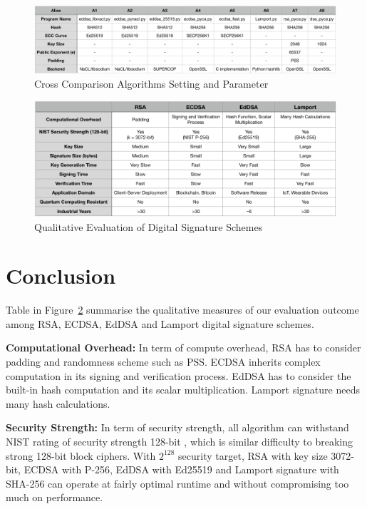\documentclass[10pt,sigconf]{acmart}
\begin{document}
\begin{figure}
\centering
\includegraphics[scale=0.4]{Cross_Compare_Label.png}
\caption{\small{Cross Comparison Algorithms Setting and Parameter}}
\label{fig:Cross_Compare_Label}
\end{figure}

\begin{figure}
\centering
\includegraphics[scale=0.45]{Qualitative_Evaluation}
\caption{\small{Qualitative Evaluation of Digital Signature Schemes}}
\label{fig:Qualitative_Evaluation}
\end{figure}

\section{Conclusion}

Table in Figure~\ref{fig:Qualitative_Evaluation} summarise the qualitative measures of our evaluation outcome among RSA, ECDSA, EdDSA and Lamport digital signature schemes. 

\noindent \textbf{Computational Overhead:} \quad In term of compute overhead, RSA has to consider padding and randomness scheme such as PSS. ECDSA inherits complex computation in its signing and verification process. EdDSA has to consider the built-in hash computation and its scalar multiplication. Lamport signature needs many hash calculations.

\noindent \textbf{Security Strength:} \quad In term of security strength, all algorithm can withstand NIST rating of security strength 128-bit \cite{nistKeysizes}, which is similar difficulty to breaking strong 128-bit block ciphers. With $2^{128}$ security target, RSA with key size 3072-bit, ECDSA with P-256, EdDSA with Ed25519 and Lamport signature with SHA-256 can operate at fairly optimal runtime and without compromising too much on performance.
\end{document}
